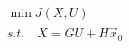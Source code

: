 \documentclass{article}
\begin{document}
\thispagestyle{empty}

$$
\begin{array}{l}
\min J(X,U)\\
s.t.\quad X=GU + H\vec{x}_0
\end{array}
$$
\fi
\end{document}
